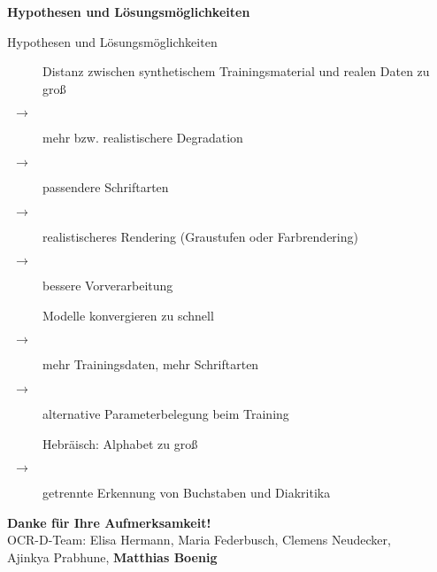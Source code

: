 \documentclass{bbawslides}
\begin{document}
\begin{bbawpart}{\Large\bf Hypothesen und Lösungsmöglichkeiten}
\end{bbawpart}

\begin{bbawslide}{Hypothesen und Lösungsmöglichkeiten}
  \vspace*{7mm}%
  \centerslidestrue%
  \begin{description}
    \item[\labelitemi] Distanz zwischen synthetischem Trainingsmaterial und realen Daten zu groß
    \item[$~~\rightarrow$] mehr bzw. realistischere Degradation
    \item[$~~\rightarrow$] passendere Schriftarten
    \item[$~~\rightarrow$] realistischeres Rendering (Graustufen oder Farbrendering)
    \item[$~~\rightarrow$] bessere Vorverarbeitung
    \item[\labelitemi] Modelle konvergieren zu schnell
    \item[$~~\rightarrow$] mehr Trainingsdaten, mehr Schriftarten
    \item[$~~\rightarrow$] alternative Parameterbelegung beim Training
    \item[\labelitemi] Hebräisch: Alphabet zu groß
    \item[$~~\rightarrow$] getrennte Erkennung von Buchstaben und Diakritika
  \end{description}
\end{bbawslide}

\begin{bbawpart}{\Large\bf Danke für Ihre Aufmerksamkeit!\\}
OCR-D-Team: Elisa Hermann, Maria Federbusch, Clemens Neudecker,\\Ajinkya Prabhune, \textbf{Matthias Boenig}
\end{bbawpart}
\end{document}
